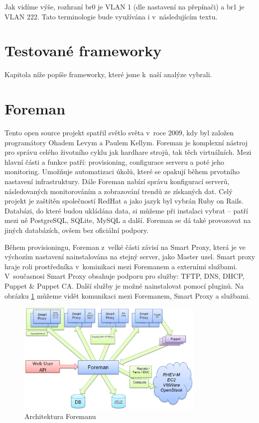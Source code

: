Jak vidíme výše, rozhraní br0 je VLAN 1 (dle nastavení na přepínači) a br1 je VLAN 222. Tato terminologie bude využívána i v~následujícím textu.


\section{Testované frameworky}

Kapitola níže popíše frameworky, které jsme k~naší analýze vybrali.
\section{Foreman}

Tento open source projekt spatřil světlo světa v~roce 2009, kdy byl založen programátory Ohadem Levym a Paulem Kellym. Foreman \cite{foreman} je komplexní nástroj pro správu celého životního cyklu jak hardhare strojů, tak těch virtuálních. Mezi hlavní části a funkce patří: provisioning, configurace serveru a poté jeho monitoring. Umožňuje automatizaci úkolů, které se opakují během prvotního nastavení infrastruktury. Dále Foreman nabízí správu konfigurací serverů, následovaných monitorováním a zobrazování trendů ze získaných dat.  Celý projekt je zaštítěn společností RedHat a jako jazyk byl vybrán Ruby on Rails. Databázi, do které budou ukládána data, si můžeme při instalaci vybrat -- patří mezi ně PostgreSQL, SQLite, MySQL a další. Foreman se dá také provozovat na jiných databázích, ovšem bez oficiální podpory.

Během provisioningu, Foreman z~velké části závisí na Smart Proxy, která je ve výchozím nastavení nainstalována na stejný server, jako Master uzel. Smart proxy hraje roli prostředníka v~kominikaci mezi Foremanem a externími službami. V~současnosi Smart Proxy obsahuje podporu pro služby: TFTP, DNS, DHCP, Puppet \& Puppet CA. Další služby je možné nainstalovat pomocí pluginů. Na obrázku \ref{arch-foreman} můžeme vidět komunikaci mezi Foremanem, Smart Proxy a službami.

\begin{figure}[h]\centering
\includegraphics[width=0.8\textwidth]{files/foreman_architecture.png}
	\caption{Architektura Foremanu \cite{foreman-arch}}\label{arch-foreman}
\end{figure}


